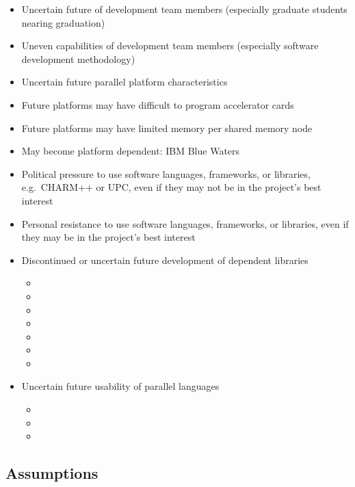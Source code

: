 \documentclass[11pt]{article}
\begin{document}
    \begin{itemize} 
%
    \item Uncertain future of development team members (especially
    graduate students nearing graduation)
%
    \item Uneven capabilities of development team members (especially
    software development methodology)
%
    \item Uncertain future parallel platform characteristics
%
    \item Future platforms may have difficult to program accelerator cards
%
    \item Future platforms may have limited memory per shared memory node
%
    \item May become platform dependent: IBM Blue Waters
%
    \item Political pressure to use software languages, frameworks, or libraries, e.g.~CHARM++ or UPC, even if they may not be in the project's best interest
%
    \item Personal resistance to use software languages, frameworks, or libraries, even if they may be in the project's best interest
%
    \item Discontinued or uncertain future development of dependent libraries
%
    \begin{itemize}
        \item {}
        \item {}
        \item {}
        \item {}
        \item {}
        \item {}
        \item {}
    \end{itemize}
%
    \item Uncertain future usability of parallel languages
%
    \begin{itemize}
        \item {}
        \item {}
        \item {}
    \end{itemize}
%
\end{itemize}

   


\subsection{Assumptions}
\end{document}
